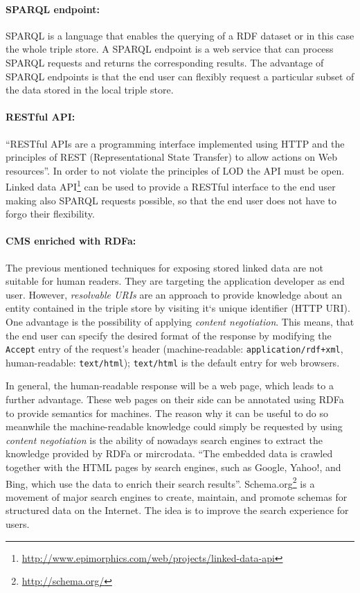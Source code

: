 \documentclass{article}
\begin{document}
\paragraph{SPARQL endpoint:} SPARQL is a language that enables the querying of a RDF dataset or in this case the whole triple store. A SPARQL endpoint is a web service that can process SPARQL requests and returns the corresponding results. The advantage of SPARQL endpoints is that the end user can flexibly request a particular subset of the data stored in the local triple store.

\paragraph{RESTful API:} \enquote{RESTful APIs are a programming interface implemented using HTTP and the principles of REST (Representational State Transfer) to allow actions on Web resources}.\cite{hyland_linked_????}
In order to not violate the principles of LOD the API must be open. Linked data API\footnote{\url{http://www.epimorphics.com/web/projects/linked-data-api}} can be used to provide a RESTful interface to the end user making also SPARQL requests possible, so that the end user does not have to forgo their flexibility.

\paragraph{CMS enriched with RDFa:} The previous mentioned techniques for exposing stored linked data are not suitable for human readers. They are targeting the application developer as end user. However,  \textit{resolvable URIs} are an approach to provide knowledge about an entity contained in the triple store by visiting it`s unique identifier (HTTP URI). One advantage is the possibility of applying \textit{content negotiation}. This means, that the end user can specify the desired format of the response by modifying the \texttt{Accept} entry of the request's header (machine-readable: \texttt{application/rdf+xml}, human-readable: \texttt{text/html}); \texttt{text/html} is the default entry for web browsers.

In general, the human-readable response will be a web page, which leads to a further advantage. These web pages on their side can be annotated using RDFa to provide semantics for machines. The reason why it can be useful to do so meanwhile the machine-readable knowledge could simply be requested by using \textit{content negotiation} is the ability of nowadays search engines to extract the knowledge provided by RDFa or mircrodata. \enquote{The embedded data is crawled together with the HTML pages by search engines, such as Google, Yahoo!, and Bing, which use the data to enrich their search results}\cite{bizer_deployment_2013}. Schema.org\footnote{\url{http://schema.org/}} is a movement of major search engines to create, maintain, and promote schemas for structured data on the Internet. The idea is to improve the search experience for users.
\end{document}
